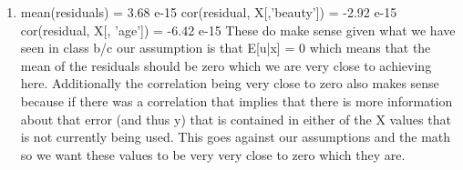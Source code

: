 \documentclass{article}
\begin{document}
\begin{enumerate}
\begin{enumerate}
				\item
				mean(residuals) = 3.68 e-15 \newline
				cor(residual, X[,'beauty']) = -2.92 e-15 \newline
				cor(residual, X[, 'age']) = -6.42 e-15 \newline
				\newline
				These do make sense given what we have seen in class b/c our assumption is that E[u|x] = 0 which means that the mean of the residuals should be zero which we are very close to achieving here. Additionally the correlation being very close to zero also makes sense because if there was a correlation that implies that there is more information about that error (and thus y) that is contained in either of the X values that is not currently being used. This goes against our assumptions and the math so we want these values to be very very close to zero which they are.
			\end{enumerate}	
		
	\end{enumerate}
\end{document}
